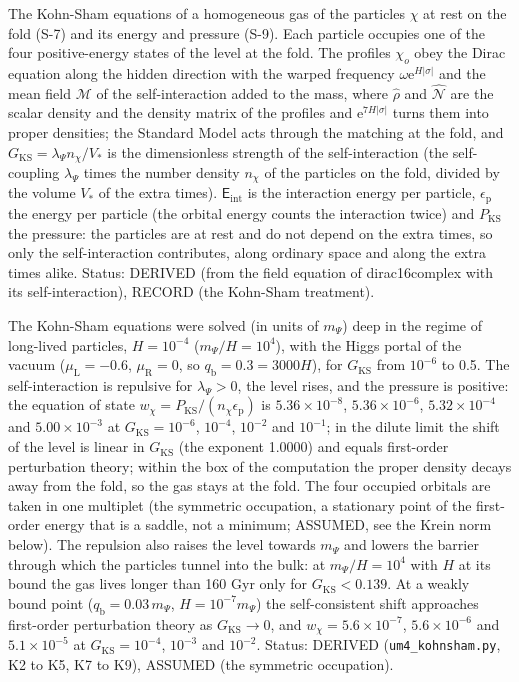 \documentclass[
  10pt,
]{article}
\begin{document}
The Kohn-Sham equations of a homogeneous gas of the particles \(\chi\)
at rest on the fold (S-7) and its energy and pressure (S-9). Each
particle occupies one of the four positive-energy states of the level at
the fold. The profiles \(\chi_o\) obey the Dirac equation along the
hidden direction with the warped frequency
\(\omega\mathrm{e}^{H\lvert\sigma\rvert}\) and the mean field
\(\mathcal{M}\) of the self-interaction added to the mass, where
\(\hat\rho\) and \(\hat{\mathcal{N}}\) are the scalar density and the
density matrix of the profiles and \(\mathrm{e}^{7H\lvert\sigma\rvert}\)
turns them into proper densities; the Standard Model acts through the
matching at the fold, and \(G_{\mathrm{KS}} = \lambda_\Psi n_\chi/V_*\)
is the dimensionless strength of the self-interaction (the self-coupling
\(\lambda_\Psi\) times the number density \(n_\chi\) of the particles on
the fold, divided by the volume \(V_*\) of the extra times).
\(\mathsf{E}_{\mathrm{int}}\) is the interaction energy per particle,
\(\epsilon_{\mathrm{p}}\) the energy per particle (the orbital energy
counts the interaction twice) and \(P_{\mathrm{KS}}\) the pressure: the
particles are at rest and do not depend on the extra times, so only the
self-interaction contributes, along ordinary space and along the extra
times alike. Status: DERIVED (from the field equation of dirac16complex
with its self-interaction), RECORD (the Kohn-Sham treatment).

The Kohn-Sham equations were solved (in units of \(m_\Psi\)) deep in the
regime of long-lived particles, \(H = 10^{-4}\) (\(m_\Psi/H = 10^4\)),
with the Higgs portal of the vacuum (\(\mu_{\mathrm{L}} = -0.6\),
\(\mu_{\mathrm{R}} = 0\), so \(q_{\mathrm{b}} = 0.3 = 3000H\)), for
\(G_{\mathrm{KS}}\) from \(10^{-6}\) to 0.5. The self-interaction is
repulsive for \(\lambda_\Psi > 0\), the level rises, and the pressure is
positive: the equation of state
\(w_\chi = P_{\mathrm{KS}}/(n_\chi\epsilon_{\mathrm{p}})\) is
\(5.36\times10^{-8}\), \(5.36\times10^{-6}\), \(5.32\times10^{-4}\) and
\(5.00\times10^{-3}\) at \(G_{\mathrm{KS}} = 10^{-6}\), \(10^{-4}\),
\(10^{-2}\) and \(10^{-1}\); in the dilute limit the shift of the level
is linear in \(G_{\mathrm{KS}}\) (the exponent 1.0000) and equals
first-order perturbation theory; within the box of the computation the
proper density decays away from the fold, so the gas stays at the fold.
The four occupied orbitals are taken in one multiplet (the symmetric
occupation, a stationary point of the first-order energy that is a
saddle, not a minimum; ASSUMED, see the Krein norm below). The repulsion
also raises the level towards \(m_\Psi\) and lowers the barrier through
which the particles tunnel into the bulk: at \(m_\Psi/H = 10^4\) with
\(H\) at its bound the gas lives longer than 160 Gyr only for
\(G_{\mathrm{KS}} < 0.139\). At a weakly bound point
(\(q_{\mathrm{b}} = 0.03\,m_\Psi\), \(H = 10^{-7}m_\Psi\)) the
self-consistent shift approaches first-order perturbation theory as
\(G_{\mathrm{KS}} \to 0\), and \(w_\chi = 5.6\times10^{-7}\),
\(5.6\times10^{-6}\) and \(5.1\times10^{-5}\) at
\(G_{\mathrm{KS}} = 10^{-4}\), \(10^{-3}\) and \(10^{-2}\). Status:
DERIVED (\texttt{um4\_kohnsham.py}, K2 to K5, K7 to K9), ASSUMED (the
symmetric occupation).
\end{document}
